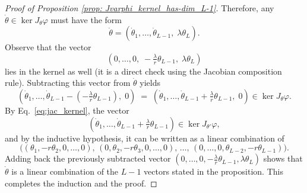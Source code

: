 \documentclass[final]{article}
\newcommand{\conv}{\ast}
\newcommand{\kprod}{\otimes}
\theoremstyle{definition}
\theoremstyle{plain}
\begin{document}
\begin{proof}[Proof of Proposition \ref{prop: Jvarphi_kernel_has-dim_L-1}]

Therefore, any $\dot\theta\in\ker J_\theta\varphi$ must have the form
\[
\dot\theta = (\dot\theta_1,\dots,\dot\theta_{L-1},\;\lambda\theta_L).
\]
Observe that the vector
\[
(0,\dots,0,\;-\tfrac{\lambda}{r}\theta_{L-1},\;\lambda\theta_L)
\]
lies in the kernel as well (it is a direct check using the Jacobian composition rule). Subtracting this vector from $\dot\theta$ yields
\[
(\dot\theta_1,\dots,\dot\theta_{L-1}-(-\tfrac{\lambda}{r}\theta_{L-1}),\;0)
\;=\;
(\dot\theta_1,\dots,\dot\theta_{L-1}+\tfrac{\lambda}{r}\theta_{L-1},\;0)
\in \ker J_{\theta}\varphi.
\]
By Eq.~\eqref{eq:jac_kernel}, the vector 
\[(\dot\theta_1,\dots,\dot\theta_{L-1}+\tfrac{\lambda}{r}\theta_{L-1}) \in \ker J_{\theta'}\varphi,
\]
and by the inductive hypothesis, it can be written as a linear combination of
\[
\bigl((\theta_1,-r\theta_2,0,\dots,0),\,
(0,\theta_2,-r\theta_3,0,\dots,0),\,
\dots,\,
(0,\dots,0,\theta_{L-2},-r\theta_{L-1})\bigr).
\]
Adding back the previously subtracted vector
$(0,\dots,0,-\tfrac{\lambda}{r}\theta_{L-1},\lambda\theta_L)$
shows that $\dot\theta$ is a linear combination of the $L-1$ vectors stated in the proposition.
This completes the induction and the proof.
\end{proof}
\end{document}
